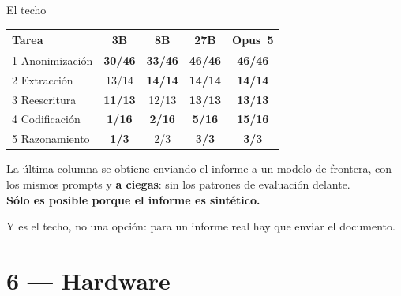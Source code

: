 \documentclass[aspectratio=169,11pt]{beamer}
\newcommand{\bien}[1]{\textcolor{bueno}{\textbf{#1}}}
\newcommand{\mal}[1]{\textcolor{acento}{\textbf{#1}}}
\begin{document}
\begin{frame}{El techo}
  \centering\small
  \begin{tabular}{@{}lcccc@{}}
    \toprule
    \textbf{Tarea} & \textbf{3B} & \textbf{8B} & \textbf{27B} & \textbf{Opus~5} \\
    \midrule
    1 Anonimización & \mal{30/46} & \mal{33/46} & \bien{46/46} & \bien{46/46} \\
    2 Extracción & 13/14 & \bien{14/14} & \bien{14/14} & \bien{14/14} \\
    3 Reescritura & \mal{11/13} & 12/13 & \bien{13/13} & \bien{13/13} \\
    \midrule
    4 Codificación & \mal{1/16} & \mal{2/16} & \mal{5/16} & \bien{15/16} \\
    5 Razonamiento & \mal{1/3} & 2/3 & \bien{3/3} & \bien{3/3} \\
    \bottomrule
  \end{tabular}

  \vspace{.8em}
  \begin{center}\footnotesize
  La última columna se obtiene enviando el informe a un modelo de frontera, con
  los mismos prompts y \textbf{a ciegas}: sin los patrones de evaluación
  delante.\\
  \textbf{Sólo es posible porque el informe es sintético.}
  \end{center}
  \vspace{.4em}
  \centering\small Y es el techo, no una opción: para un informe real hay que
  enviar el documento.
\end{frame}

\section{6 — Hardware}
\end{document}
